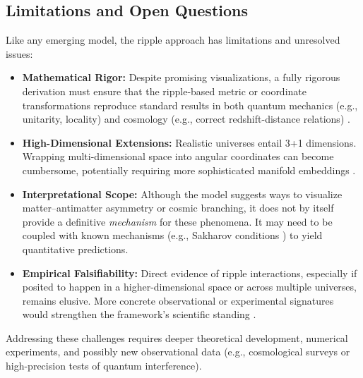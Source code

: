 \documentclass{article}
\begin{document}
\subsection{Limitations and Open Questions}
\label{subsec:limitations-open}
Like any emerging model, the ripple approach has limitations and unresolved 
issues:
\begin{itemize}
  \item \textbf{Mathematical Rigor:} 
    Despite promising visualizations, a fully rigorous derivation must ensure 
    that the ripple-based metric or coordinate transformations reproduce 
    standard results in both quantum mechanics (e.g., unitarity, locality) 
    and cosmology (e.g., correct redshift-distance relations) \cite{misner1973, hawking1988}.
  \item \textbf{High-Dimensional Extensions:} 
    Realistic universes entail 3+1 dimensions. Wrapping multi-dimensional 
    space into angular coordinates can become cumbersome, potentially 
    requiring more sophisticated manifold embeddings \cite{penrose2004, susskind2008}.
  \item \textbf{Interpretational Scope:} 
    Although the model suggests ways to visualize matter--antimatter asymmetry 
    or cosmic branching, it does not by itself provide a definitive \emph{mechanism} 
    for these phenomena. It may need to be coupled with known mechanisms (e.g., 
    Sakharov conditions \cite{Sakharov1967}) to yield quantitative predictions.
  \item \textbf{Empirical Falsifiability:} 
    Direct evidence of ripple interactions, especially if posited to happen 
    in a higher-dimensional space or across multiple universes, remains 
    elusive. More concrete observational or experimental signatures 
    would strengthen the framework’s scientific standing \cite{Guth1981, Linde1983}.
\end{itemize}
Addressing these challenges requires deeper theoretical development, numerical 
experiments, and possibly new observational data (e.g., cosmological surveys 
or high-precision tests of quantum interference).
\end{document}
